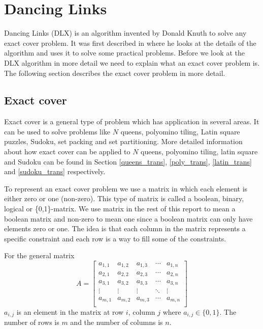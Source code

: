
\chapter{Dancing Links}
\label{dancing_links}

Dancing Links (DLX) is an algorithm invented by Donald Knuth to solve any exact cover problem.
It was first described in \cite{knuth00dancing} where he looks at the details of the algorithm and uses it to solve some practical problems.
Before we look at the DLX algorithm in more detail we need to explain what an exact cover problem is.
The following section describes the exact cover problem in more detail.



\section{Exact cover}
\label{exact_cover}

Exact cover is a general type of problem which has application in several areas.
It can be used to solve problems like $N$ queens, polyomino tiling, Latin square puzzles, Sudoku, set packing and set partitioning.
More detailed information about how exact cover can be applied to $N$ queens, polyomino tiling, latin square and Sudoku can be found in Section \ref{queens_trans}, \ref{poly_trans}, \ref{latin_trans} and \ref{sudoku_trans} respectively.

To represent an exact cover problem we use a matrix in which each element is either zero or one (non-zero).
This type of matrix is called a boolean, binary, logical or \{0,1\}-matrix.
We use matrix in the rest of this report to mean a boolean matrix and non-zero to mean one since a boolean matrix can only have elements zero or one.
The idea is that each column in the matrix represents a specific constraint and each row is a way to fill some of the constraints.

For the general matrix
\begin{equation}
A =
\left[
\begin{array}{ccccc}
	a_{1,1} & a_{1,2} & a_{1,3} & \cdots & a_{1,n} \\
	a_{2,1} & a_{2,2} & a_{2,3} & \cdots & a_{2,n} \\
	a_{3,1} & a_{3,2} & a_{3,3} & \cdots & a_{3,n} \\
	\vdots  & \vdots  & \vdots  & \ddots & \vdots  \\
	a_{m,1} & a_{m,2} & a_{m,3} & \cdots & a_{m,n} \\
\end{array}
\right]
\label{eq:gen_cover_matrix}
\end{equation}
$a_{i,j}$ is an element in the matrix at row $i$, column $j$ where $a_{i,j} \in \{0,1\}$.
The number of rows is $m$ and the number of columns is $n$.

